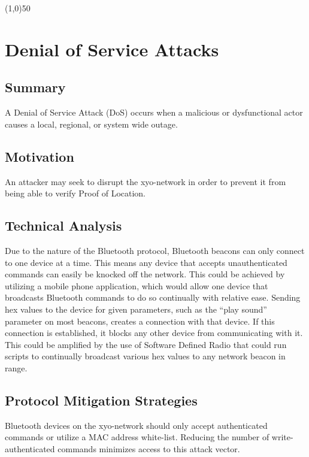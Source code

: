 \documentclass{article}
\begin{document}
\begin{center}
\line(1,0){50}
\end{center}

\section{Denial of Service Attacks}

\subsection{Summary}
A Denial of Service Attack (DoS) occurs when a malicious or dysfunctional actor causes a local, regional, or system wide outage. 

\subsection{Motivation}

An attacker may seek to disrupt the \Gls{xyo-network} in order to prevent it from being able to verify Proof of Location.

\subsection{Technical Analysis}

Due to the nature of the Bluetooth protocol, Bluetooth beacons can only connect to one device at a time. This means any device that accepts unauthenticated commands can easily be knocked off the network. This could be achieved by utilizing a mobile phone application, which would allow one device that broadcasts Bluetooth commands to do so continually with relative ease. Sending hex values to the device for given parameters, such as the ``play sound'' parameter on most beacons, creates a connection with that device. If this connection is established, it blocks any other device from communicating with it. This could be amplified by the use of Software Defined Radio that could run scripts to continually broadcast various hex values to any network beacon in range. 

\subsection{Protocol Mitigation Strategies}
Bluetooth devices on the \Gls{xyo-network} should only accept authenticated commands or utilize a MAC address white-list. Reducing the number of write-authenticated commands minimizes access to this attack vector. 
\end{document}
